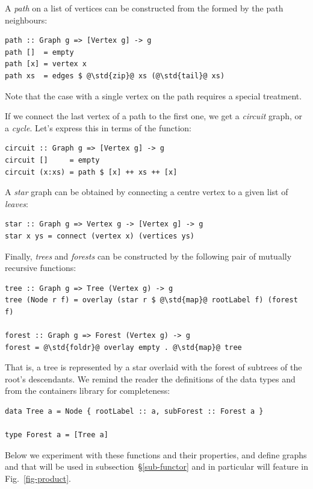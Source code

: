 A \emph{path} on a list of vertices can be constructed from the 
formed by the path neighbours:

\begin{verbatim}
path :: Graph g => [Vertex g] -> g
path []  = empty
path [x] = vertex x
path xs  = edges $ @\std{zip}@ xs (@\std{tail}@ xs)
\end{verbatim}

\noindent
Note that the case with a single vertex on the path requires a special treatment.

If we connect the last vertex of a path to the first one, we get a \emph{circuit}
graph, or a \emph{cycle}. Let's express this in terms of the  function:

\begin{verbatim}
circuit :: Graph g => [Vertex g] -> g
circuit []     = empty
circuit (x:xs) = path $ [x] ++ xs ++ [x]
\end{verbatim}

A \emph{star} graph can be obtained by connecting a centre vertex to a given
list of \emph{leaves}:

\begin{verbatim}
star :: Graph g => Vertex g -> [Vertex g] -> g
star x ys = connect (vertex x) (vertices ys)
\end{verbatim}

Finally, \emph{trees} and \emph{forests} can be constructed by the following
pair of mutually recursive functions:

\begin{verbatim}
tree :: Graph g => Tree (Vertex g) -> g
tree (Node r f) = overlay (star r $ @\std{map}@ rootLabel f) (forest f)

forest :: Graph g => Forest (Vertex g) -> g
forest = @\std{foldr}@ overlay empty . @\std{map}@ tree
\end{verbatim}

\noindent
That is, a tree is represented by a star overlaid with the forest
of subtrees of the root's descendants. We remind the reader the
definitions of the data types  and  from the
\textsf{containers} library for completeness:

\begin{verbatim}
data Tree a = Node { rootLabel :: a, subForest :: Forest a }

type Forest a = [Tree a]
\end{verbatim}

Below we experiment with these functions and their properties, and define
graphs  and  that will be used in subsection~\S\ref{sub-functor}
and in particular will feature in Fig.~\ref{fig-product}.

